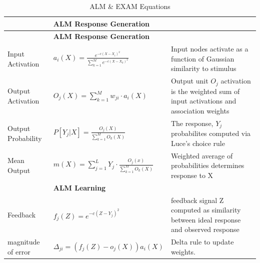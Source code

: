 \documentclass[
  11pt,
  letterpaper,
]{article}
\begin{document}
\begin{longtable}[]{@{}
  >{\raggedright\arraybackslash}p{}
  >{\raggedright\arraybackslash}p{}
  >{\raggedright\arraybackslash}p{}@{}}
\caption{ALM \& EXAM Equations}\label{tbl-alm-exam}\tabularnewline
\toprule\noalign{}
\begin{minipage}[b]{\linewidth}\raggedright
\end{minipage} & \begin{minipage}[b]{\linewidth}\raggedright
\textbf{ALM Response Generation}
\end{minipage} & \begin{minipage}[b]{\linewidth}\raggedright
\end{minipage} \\
\midrule\noalign{}
\endfirsthead
\toprule\noalign{}
\begin{minipage}[b]{\linewidth}\raggedright
\end{minipage} & \begin{minipage}[b]{\linewidth}\raggedright
\textbf{ALM Response Generation}
\end{minipage} & \begin{minipage}[b]{\linewidth}\raggedright
\end{minipage} \\
\midrule\noalign{}
\endhead
\bottomrule\noalign{}
\endlastfoot
Input Activation &
\(a_i(X) = \frac{e^{-c(X-X_i)^2}}{\sum_{k=1}^M e^{-c(X-X_k)^2}}\) &
Input nodes activate as a function of Gaussian similarity to stimulus \\
Output Activation & \(O_j(X) = \sum_{k=1}^M w_{ji} \cdot a_i(X)\) &
Output unit \(O_j\) activation is the weighted sum of input activations
and association weights \\
Output Probability & \(P[Y_j|X] = \frac{O_j(X)}{\sum_{k=1}^M O_k(X)}\) &
The response, \(Y_j\) probabilites computed via Luce's choice rule \\
Mean Output &
\(m(X) = \sum_{j=1}^L Y_j \cdot \frac{O_j(x)}{\sum_{k=1}^M O_k(X)}\) &
Weighted average of probabilities determines response to X \\
& \textbf{ALM Learning} & \\
Feedback & \(f_j(Z) = e^{-c(Z-Y_j)^2}\) & feedback signal Z computed as
similarity between ideal response and observed response \\
magnitude of error & \(\Delta_{ji}=(f_{j}(Z)-o_{j}(X))a_{i}(X)\) & Delta
rule to update weights. \\

\end{longtable}
\end{document}
